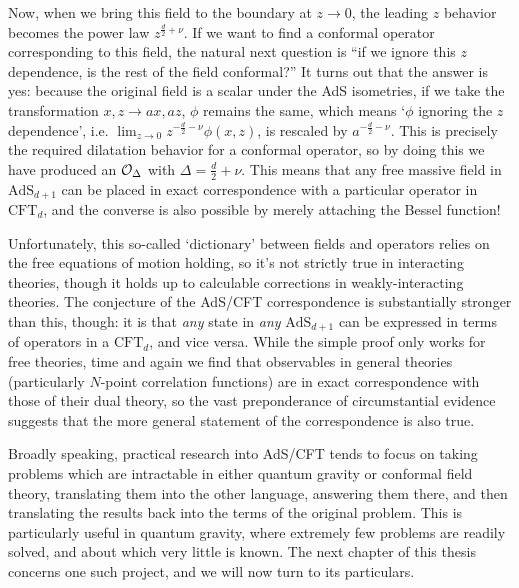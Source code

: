 Now, when we bring this field to the boundary at $z \to 0$, the leading $z$
behavior becomes the power law $z^{\frac{d}{2} + \nu}$. If we want to find a
conformal operator corresponding to this field, the natural next question is 
``if we ignore this $z$ dependence, is the rest of the field conformal?'' It 
turns out that the answer is yes: because the original field is a scalar under 
the AdS isometries, if we take the transformation $x, z \to ax, az$, $\phi$ 
remains the same, which means `$\phi$ ignoring the $z$ dependence', i.e. 
$\lim_{z \to 0} z^{-\frac{d}{2} - \nu} \phi(x, z)$, is rescaled by 
$a^{-\frac{d}{2} - \nu}$. This is precisely the required dilatation behavior for
a conformal operator, so by doing this we have produced an ${\cal O}_\Delta$
with $\Delta = \frac{d}{2} + \nu$. This means that any free massive field in
$\mathrm{AdS}_{d+1}$ can be placed in exact correspondence with a particular
operator in $\mathrm{CFT}_d$, and the converse is also possible by merely 
attaching the Bessel function!

Unfortunately, this so-called `dictionary' between fields and operators relies
on the free equations of motion holding, so it's not strictly true in 
interacting theories, though it holds up to calculable corrections in 
weakly-interacting theories\cite{Kaplan:cftnotes}. The conjecture of the AdS/CFT
correspondence is substantially stronger than this, though: it is that 
\emph{any} state in \emph{any} $\mathrm{AdS}_{d+1}$ can be expressed in terms of
operators in a $\mathrm{CFT}_d$, and vice versa. While the simple proof only
works for free theories, time and again we find that observables in general
theories (particularly $N$-point correlation functions) are in exact 
correspondence with those of their dual theory, so the vast preponderance of 
circumstantial evidence suggests that the more general statement of the 
correspondence is also true\cite{Polchinski:TASI}.

Broadly speaking, practical research into AdS/CFT tends to focus on taking 
problems which are intractable in either quantum gravity or conformal field 
theory, translating them into the other language, answering them there, and then
translating the results back into the terms of the original problem. This is 
particularly useful in quantum gravity, where extremely few problems are readily 
solved, and about which very little is known. The next chapter of this thesis 
concerns one such project, and we will now turn to its particulars.

